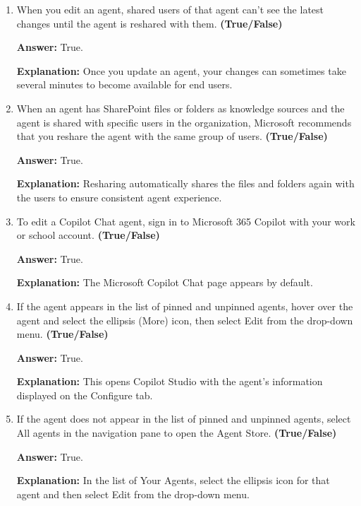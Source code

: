 \documentclass[10pt]{article}
\begin{document}
\begin{enumerate}[leftmargin=*]
\textbf{Answer:} True.

\textbf{Explanation:} For a Copilot Chat agent, you use Copilot Studio. For a SharePoint agent, you use the Copilot agent tool embedded within SharePoint.

\item When you edit an agent, shared users of that agent can't see the latest changes until the agent is reshared with them. \textbf{(True/False)}

\textbf{Answer:} True.

\textbf{Explanation:} Once you update an agent, your changes can sometimes take several minutes to become available for end users.

\item When an agent has SharePoint files or folders as knowledge sources and the agent is shared with specific users in the organization, Microsoft recommends that you reshare the agent with the same group of users. \textbf{(True/False)}

\textbf{Answer:} True.

\textbf{Explanation:} Resharing automatically shares the files and folders again with the users to ensure consistent agent experience.

\item To edit a Copilot Chat agent, sign in to Microsoft 365 Copilot with your work or school account. \textbf{(True/False)}

\textbf{Answer:} True.

\textbf{Explanation:} The Microsoft Copilot Chat page appears by default.

\item If the agent appears in the list of pinned and unpinned agents, hover over the agent and select the ellipsis (More) icon, then select Edit from the drop-down menu. \textbf{(True/False)}

\textbf{Answer:} True.

\textbf{Explanation:} This opens Copilot Studio with the agent's information displayed on the Configure tab.

\item If the agent does not appear in the list of pinned and unpinned agents, select All agents in the navigation pane to open the Agent Store. \textbf{(True/False)}

\textbf{Answer:} True.

\textbf{Explanation:} In the list of Your Agents, select the ellipsis icon for that agent and then select Edit from the drop-down menu.


\end{enumerate}
\end{document}
